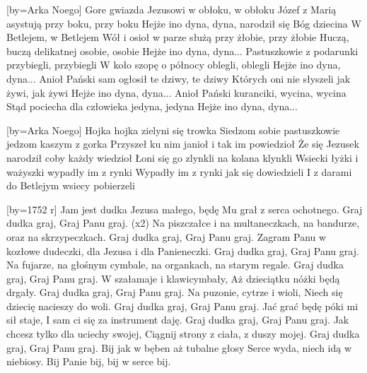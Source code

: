 [by={Arka Noego}]
\beginverse
Gore gwiazda Jezusowi w obłoku, w obłoku
Józef z Marią asystują przy boku, przy boku
\endverse
\beginchorus
Hejże ino dyna, dyna, 
narodził się Bóg dziecina
W Betlejem, w Betlejem
\endchorus
\beginverse
Wół i osioł w parze służą przy żłobie, przy żłobie
Huczą, buczą delikatnej osobie, osobie
\endverse
\beginchorus
Hejże ino dyna, dyna...
\endchorus
\beginverse
Pastuszkowie z podarunki przybiegli, przybiegli
W koło szopę o północy oblegli, oblegli
\endverse
\beginchorus
Hejże ino dyna, dyna...
\endchorus
\beginverse
Anioł Pański sam ogłosił te dziwy, te dziwy
Których oni nie słyszeli jak żywi, jak żywi
\endverse
\beginchorus
Hejże ino dyna, dyna...
\endchorus
\beginverse
Anioł Pański kuranciki, wycina, wycina
Stąd pociecha dla człowieka jedyna, jedyna
\endverse
\beginchorus
Hejże ino dyna, dyna...
\endchorus
\endsong




[by={Arka Noego}]
\beginverse
Hojka hojka \lrep zielyni się trowka \rrep {}
Siedzom sobie pastuszkowie jedzom kaszym z gorka 
Przyszeł ku nim janioł i tak im powiedzioł
Że się Jezusek narodził coby każdy wiedzioł 
Łoni się go zlynkli na kolana klynkli
Wsiecki łyżki i ważyszki wypadły im z rynki 
Wypadły im z rynki jak się dowiedzieli
I z darami do Betlejym wsiecy pobierzeli  
\endverse
\endsong


[by={1752 r}]
\beginverse
Jam jest dudka Jezusa małego,
będę Mu grał z serca ochotnego.
Graj dudka graj, Graj Panu graj. (x2)
\endverse
\beginverse
Na piszczałce i na multaneczkach,
na bandurze, oraz na skrzypeczkach.
Graj dudka graj, Graj Panu graj.
\endverse
\beginverse
Zagram Panu w kozłowe dudeczki,
dla Jezusa i dla Panieneczki.
Graj dudka graj, Graj Panu graj.
\endverse
\beginverse
Na fujarze, na głośnym cymbale,
na organkach, na starym regale.
Graj dudka graj, Graj Panu graj.
\endverse
\beginverse
W szałamaje i klawicymbały,
Aż dzieciątku nóżki będą drgały.
Graj dudka graj, Graj Panu graj.
\endverse
\beginverse
Na puzonie, cytrze i wioli,
Niech się dziecię nacieszy do woli.
Graj dudka graj, Graj Panu graj.
\endverse
\beginverse
Jać grać będę póki mi sił staje,
I sam ci się za instrument daję.
Graj dudka graj, Graj Panu graj.
\endverse
\beginverse
Jak chcesz tylko dla uciechy swojej,
Ciągnij strony z ciała, z duszy mojej.
Graj dudka graj, Graj Panu graj.
\endverse
\beginverse
Bij jak w bęben aż tubalne głosy
Serce wyda, niech idą w niebiosy.
Bij Panie bij, bij w serce bij.

